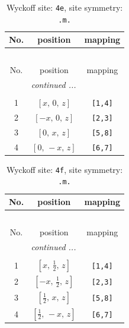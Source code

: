 \documentclass[fleqn,8pt]{jsarticle}
\begin{document}
\begin{longtable}{ccc}
\caption{Wyckoff site: {\tt 4e}, site symmetry: {\tt .m.}}
 \\
 \hline \hline
No. & position & mapping \\ \hline \endfirsthead

\multicolumn{2}{l}{\tablename\ \thetable{}} \\
 \hline \hline
No. & position & mapping \\ \hline \endhead

 \hline \hline
\multicolumn{2}{r}{\footnotesize\it continued ...} \\ \endfoot

 \hline \hline
\multicolumn{2}{r}{} \\ \endlastfoot

1 & $\left[ x,\, 0,\, z \right]$ & {\tt [1,4]} \\ \hline
2 & $\left[ - x,\, 0,\, z \right]$ & {\tt [2,3]} \\ \hline
3 & $\left[ 0,\, x,\, z \right]$ & {\tt [5,8]} \\ \hline
4 & $\left[ 0,\, - x,\, z \right]$ & {\tt [6,7]} \\
\end{longtable}
\renewcommand{\arraystretch}{1.2}
\begin{longtable}{ccc}
\caption{Wyckoff site: {\tt 4f}, site symmetry: {\tt .m.}}
 \\
 \hline \hline
No. & position & mapping \\ \hline \endfirsthead

\multicolumn{2}{l}{\tablename\ \thetable{}} \\
 \hline \hline
No. & position & mapping \\ \hline \endhead

 \hline \hline
\multicolumn{2}{r}{\footnotesize\it continued ...} \\ \endfoot

 \hline \hline
\multicolumn{2}{r}{} \\ \endlastfoot

1 & $\left[ x,\, \frac{1}{2},\, z \right]$ & {\tt [1,4]} \\ \hline
2 & $\left[ - x,\, \frac{1}{2},\, z \right]$ & {\tt [2,3]} \\ \hline
3 & $\left[ \frac{1}{2},\, x,\, z \right]$ & {\tt [5,8]} \\ \hline
4 & $\left[ \frac{1}{2},\, - x,\, z \right]$ & {\tt [6,7]} \\
\end{longtable}
\end{document}
